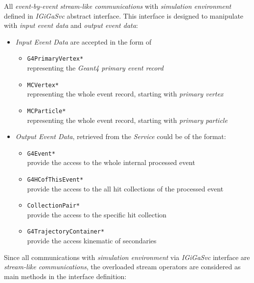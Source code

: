\documentclass[nfss,times,12pt,a4paper]{article}
\begin{document}
{All {\it event-by-event} {\it stream-like communications}  
with {\it simulation environment} defined in {\it IGiGaSvc} 
abstract interface.  This interface is designed to manipulate with
{\it input event data} and {\it output event data}: 
\begin{itemize} 
      \item {\it Input Event Data} are accepted in the form of 
      \begin{itemize}
            \item {\tt G4PrimaryVertex*} \\ 
                  representing the {\it Geant4 primary event record}
            \item {\tt MCVertex*} \\
                  representing the whole event record, starting with {\it primary vertex}
            \item {\tt MCParticle*} \\ 
                  representing the whole event record, starting with {\it primary particle}
      \end{itemize} 
      \item {\it Output Event Data}, retrieved from the {\it Service}  could be of the format:
      \begin{itemize}
            \item {\tt G4Event* } \\
                  provide the access to the whole internal processed event  
            \item {\tt G4HCofThisEvent* } \\
                  provide the access to the all hit collections of the processed event
            \item {\tt CollectionPair* } \\
                  provide the access to the specific hit collection
            \item {\tt G4TrajectoryContainer* } \\
                  provide the access kinematic of secondaries  
      \end{itemize} 
\end{itemize} 


Since all communications with {\it simulation environment} via {\it IGiGaSvc} 
interface are {\it stream-like communications}, the overloaded stream operators are 
considered as main methods in the interface definition: 

}
\end{document}
